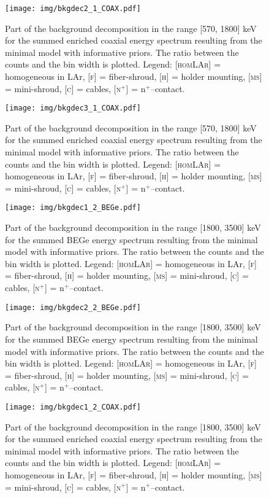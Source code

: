 \begin{landscape}
\begin{figure}
	\end{figure}
	\begin{figure}
		\centering
		\texttt{[image: img/bkgdec2\_1\_COAX.pdf]}
		\caption{Part of the background decomposition in the range [570, 1800] keV for the summed enriched coaxial energy spectrum resulting from the minimal model with informative priors. The ratio between the counts and the bin width is plotted. Legend: \textsc{[homLAr]} = homogeneous in LAr, \textsc{[f]} = fiber-shroud, \textsc{[h]} = holder mounting, \textsc{[ms]} = mini-shroud, \textsc{[c]} = cables, \textsc{[n$^+$]} = n$^+$--contact.}
	\end{figure}
	\begin{figure}
		\centering
		\texttt{[image: img/bkgdec3\_1\_COAX.pdf]}
		\caption{Part of the background decomposition in the range [570, 1800] keV for the summed enriched coaxial energy spectrum resulting from the minimal model with informative priors. The ratio between the counts and the bin width is plotted. Legend: \textsc{[homLAr]} = homogeneous in LAr, \textsc{[f]} = fiber-shroud, \textsc{[h]} = holder mounting, \textsc{[ms]} = mini-shroud, \textsc{[c]} = cables, \textsc{[n$^+$]} = n$^+$--contact.}
	\end{figure}
	\begin{figure}
		\centering
		\texttt{[image: img/bkgdec1\_2\_BEGe.pdf]}
		\caption{Part of the background decomposition in the range [1800, 3500] keV for the summed BEGe energy spectrum resulting from the minimal model with informative priors. The ratio between the counts and the bin width is plotted. Legend: \textsc{[homLAr]} = homogeneous in LAr, \textsc{[f]} = fiber-shroud, \textsc{[h]} = holder mounting, \textsc{[ms]} = mini-shroud, \textsc{[c]} = cables, \textsc{[n$^+$]} = n$^+$--contact.}
	\end{figure}
	\begin{figure}
		\centering
		\texttt{[image: img/bkgdec2\_2\_BEGe.pdf]}
		\caption{Part of the background decomposition in the range [1800, 3500] keV for the summed BEGe energy spectrum resulting from the minimal model with informative priors. The ratio between the counts and the bin width is plotted. Legend: \textsc{[homLAr]} = homogeneous in LAr, \textsc{[f]} = fiber-shroud, \textsc{[h]} = holder mounting, \textsc{[ms]} = mini-shroud, \textsc{[c]} = cables, \textsc{[n$^+$]} = n$^+$--contact.}
	\end{figure}
	\begin{figure}
		\centering
		\texttt{[image: img/bkgdec1\_2\_COAX.pdf]}
		\caption{Part of the background decomposition in the range [1800, 3500] keV for the summed enriched coaxial energy spectrum resulting from the minimal model with informative priors. The ratio between the counts and the bin width is plotted. Legend: \textsc{[homLAr]} = homogeneous in LAr, \textsc{[f]} = fiber-shroud, \textsc{[h]} = holder mounting, \textsc{[ms]} = mini-shroud, \textsc{[c]} = cables, \textsc{[n$^+$]} = n$^+$--contact.}

\end{figure}
\end{landscape}
